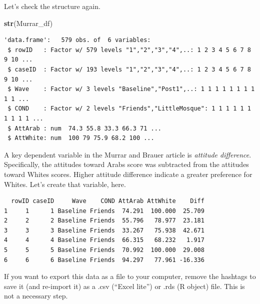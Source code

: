\documentclass[
  11pt,
]{book}
\newenvironment{Shaded}{\begin{snugshade}}{\end{snugshade}}
\newcommand{\FunctionTok}[1]{\textcolor[rgb]{0.27,0.27,0.27}{\textbf{#1}}}
\newcommand{\NormalTok}[1]{#1}
\newcommand{\OtherTok}[1]{\textcolor[rgb]{0.37,0.37,0.37}{#1}}
\newcommand{\SpecialCharTok}[1]{\textcolor[rgb]{0.43,0.43,0.43}{\textbf{#1}}}
\begin{document}
Let's check the structure again.

\begin{Shaded}
\begin{Highlighting}[]
\FunctionTok{str}\NormalTok{(Murrar\_df)}
\end{Highlighting}
\end{Shaded}

\begin{verbatim}
'data.frame':   579 obs. of  6 variables:
 $ rowID   : Factor w/ 579 levels "1","2","3","4",..: 1 2 3 4 5 6 7 8 9 10 ...
 $ caseID  : Factor w/ 193 levels "1","2","3","4",..: 1 2 3 4 5 6 7 8 9 10 ...
 $ Wave    : Factor w/ 3 levels "Baseline","Post1",..: 1 1 1 1 1 1 1 1 1 1 ...
 $ COND    : Factor w/ 2 levels "Friends","LittleMosque": 1 1 1 1 1 1 1 1 1 1 ...
 $ AttArab : num  74.3 55.8 33.3 66.3 71 ...
 $ AttWhite: num  100 79 75.9 68.2 100 ...
\end{verbatim}

A key dependent variable in the Murrar and Brauer \citep{murrar_entertainment-education_2018} article is \emph{attitude difference}. Specifically, the attitudes toward Arabs score was subtracted from the attitudes toward Whites scores. Higher attitude difference indicate a greater preference for Whites. Let's create that variable, here.

\begin{Shaded}
\end{Shaded}

\begin{verbatim}
  rowID caseID     Wave    COND AttArab AttWhite    Diff
1     1      1 Baseline Friends  74.291  100.000  25.709
2     2      2 Baseline Friends  55.796   78.977  23.181
3     3      3 Baseline Friends  33.267   75.938  42.671
4     4      4 Baseline Friends  66.315   68.232   1.917
5     5      5 Baseline Friends  70.992  100.000  29.008
6     6      6 Baseline Friends  94.297   77.961 -16.336
\end{verbatim}

If you want to export this data as a file to your computer, remove the hashtags to save it (and re-import it) as a .csv (``Excel lite'') or .rds (R object) file. This is not a necessary step.
\end{document}
